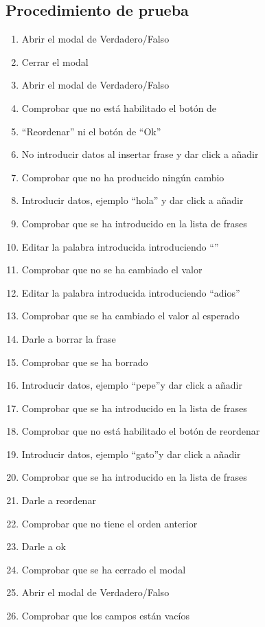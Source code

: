\subsection{Procedimiento de prueba}
\label{procedimientoPruebas:v/f}
\begin{enumerate}
    \item Abrir el modal de Verdadero/Falso
    \item Cerrar el modal
    \item Abrir el modal de Verdadero/Falso
    \item Comprobar que no está habilitado el botón de \item “Reordenar” ni el botón de “Ok”
    \item No introducir datos al insertar frase y dar click a añadir
    \item Comprobar que no ha producido ningún cambio
    \item Introducir datos, ejemplo “hola” y dar click a añadir
    \item Comprobar que se ha introducido en la lista de frases
    \item Editar la palabra introducida introduciendo “”
    \item Comprobar que no se ha cambiado el valor
    \item Editar la palabra introducida introduciendo “adios”
    \item Comprobar que se ha cambiado el valor al esperado
    \item Darle a borrar la frase
    \item Comprobar que se ha borrado
    \item Introducir datos, ejemplo “pepe”y dar click a añadir
    \item Comprobar que se ha introducido en la lista de frases
    \item Comprobar que no está habilitado el botón de reordenar
    \item Introducir datos, ejemplo “gato”y dar click a añadir
    \item Comprobar que se ha introducido en la lista de frases
    \item Darle a reordenar 
    \item Comprobar que no tiene el orden anterior
    \item Darle a ok
    \item Comprobar que se ha cerrado el modal
    \item Abrir el modal de Verdadero/Falso
    \item Comprobar que los campos están vacíos
  \end{enumerate}
